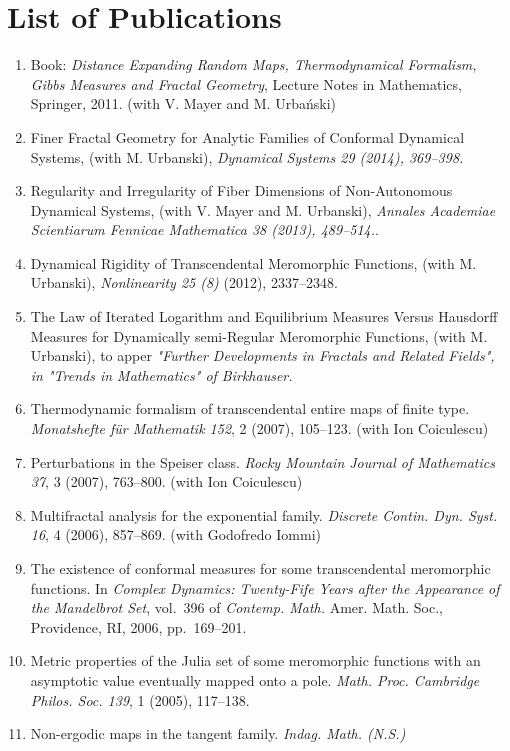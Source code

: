 \documentclass{article}
\begin{document}
\section{List of Publications}
\begin{enumerate}
\item Book: \emph{Distance Expanding Random Maps, Thermodynamical
    Formalism, Gibbs Measures and Fractal Geometry}, Lecture Notes in
  Mathematics,  Springer, 2011. (with V. Mayer and M. Urba{\'n}ski)
\item Finer Fractal Geometry for Analytic Families of Conformal
  Dynamical Systems, (with M. Urbanski), \emph{Dynamical Systems 29
    (2014), 369--398.}
\item Regularity and Irregularity of Fiber Dimensions of
  Non-Autonomous Dynamical Systems, (with V. Mayer and M. Urbanski),
  {\em Annales Academiae Scientiarum Fennicae Mathematica 38 (2013), 489--514.}.
\item Dynamical Rigidity of Transcendental Meromorphic Functions,
  (with M. Urbanski), {\em Nonlinearity 25 (8)} (2012), 2337--2348.
\item The Law of Iterated Logarithm and Equilibrium Measures Versus
  Hausdorff Measures for Dynamically semi-Regular Meromorphic
  Functions, (with M. Urbanski), to apper {\em "Further Developments in
  Fractals and Related Fields", in "Trends in Mathematics" of
  Birkhauser.}
\item Thermodynamic formalism of transcendental entire maps of finite
  type. {\em Monatshefte f\"ur Mathematik 152}, 2 (2007), 105--123.
  (with Ion Coiculescu)
\item Perturbations in the {S}peiser class.  {\em Rocky Mountain
    Journal of Mathematics 37}, 3 (2007), 763--800. (with Ion Coiculescu)
\item Multifractal analysis for the exponential family.  {\em Discrete
    Contin. Dyn. Syst. 16}, 4 (2006), 857--869.  (with Godofredo Iommi)
\item The existence of conformal measures for some transcendental
  meromorphic functions. In {\em Complex Dynamics: Twenty-Fife Years
    after the Appearance of the Mandelbrot Set}, vol.~396 of {\em
    Contemp. Math.} Amer. Math. Soc., Providence, RI, 2006,
  pp.~169--201.
\item Metric properties of the {J}ulia set of some meromorphic
  functions with an asymptotic value eventually mapped onto a pole.
  {\em Math. Proc. Cambridge Philos. Soc. 139}, 1 (2005), 117--138.
\item Non-ergodic maps in the tangent family. {\em Indag. Math. (N.S.)
}
\end{enumerate}
\end{document}
